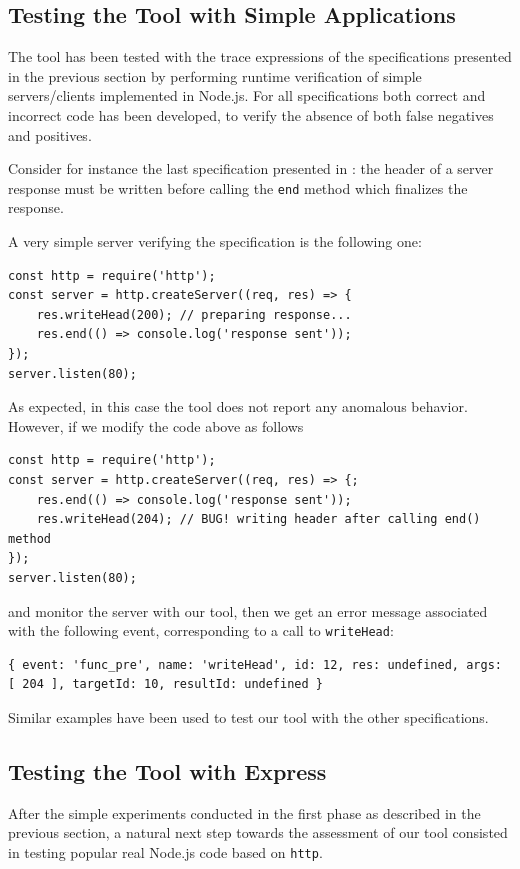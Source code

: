 \subsection{Testing the Tool with Simple Applications}
\label{sec:simple-test}
The tool has been tested with the trace expressions of the specifications presented in the previous section by performing
runtime verification of simple servers/clients implemented in Node.js.
For all specifications both correct and incorrect code has been developed, to verify the absence of both false negatives and positives.

Consider for instance the last specification presented in :
the header of a server response must be written before calling the \lstinline{end} method which finalizes the response.

A very simple server verifying the specification is the following one:
\begin{lstlisting}
const http = require('http');
const server = http.createServer((req, res) => {
	res.writeHead(200); // preparing response...
	res.end(() => console.log('response sent'));
});
server.listen(80);
\end{lstlisting}

As expected, in this case the tool does not report any anomalous behavior.
However, if we modify the code above as follows
\begin{lstlisting}
const http = require('http');
const server = http.createServer((req, res) => {;
	res.end(() => console.log('response sent'));
	res.writeHead(204); // BUG! writing header after calling end() method
});
server.listen(80);
\end{lstlisting}
and monitor the server with our tool, then we get an error message associated with the following event, corresponding
to a call to \lstinline{writeHead}:
\begin{lstlisting}
{ event: 'func_pre', name: 'writeHead', id: 12, res: undefined, args: [ 204 ], targetId: 10, resultId: undefined }
\end{lstlisting}

Similar examples have been used to test our tool with the other specifications.

\subsection{Testing the Tool with Express}\label{sec:express}

After the simple experiments conducted in the first phase as described in the previous section,
a natural next step towards the assessment of our tool consisted in testing popular real Node.js code
based on \lstinline{http}.

